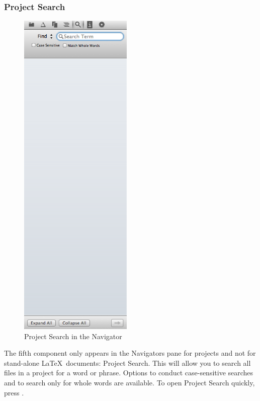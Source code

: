 \subsubsection{Project Search}
\begin{figure}
\includegraphics[width=0.48\textwidth, trim = 0 9in 0 0, clip = true]{TeXnicle-Images/texnicle-nav-projfind.png}
\caption{Project Search in the Navigator}
\label{fig:texnicle-nav-projsearch}
\end{figure}
The fifth component only appears in the Navigators pane for projects and not for stand-alone \LaTeX\ documents: Project Search. This will allow you to search all files in a project for a word or phrase. Options to conduct case-sensitive searches and to search only for whole words are available. To open Project Search quickly, press .

